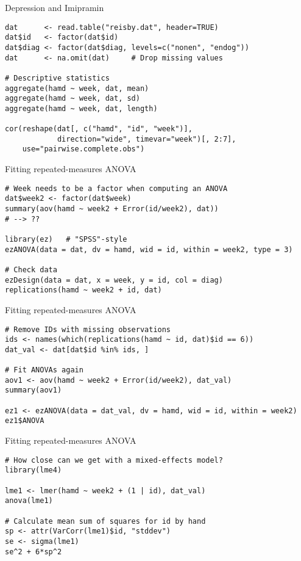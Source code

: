 \documentclass[aspectratio=169]{beamer}
\begin{document}
{

\begin{frame}[fragile]{Depression and Imipramin}
  \begin{lstlisting}
dat      <- read.table("reisby.dat", header=TRUE)
dat$id   <- factor(dat$id)
dat$diag <- factor(dat$diag, levels=c("nonen", "endog"))
dat      <- na.omit(dat)     # Drop missing values

# Descriptive statistics
aggregate(hamd ~ week, dat, mean)
aggregate(hamd ~ week, dat, sd)
aggregate(hamd ~ week, dat, length)

cor(reshape(dat[, c("hamd", "id", "week")], 
            direction="wide", timevar="week")[, 2:7],
    use="pairwise.complete.obs")
  \end{lstlisting}
\end{frame}

\begin{frame}[fragile]{Fitting repeated-measures ANOVA}
  \begin{lstlisting}
# Week needs to be a factor when computing an ANOVA
dat$week2 <- factor(dat$week)
summary(aov(hamd ~ week2 + Error(id/week2), dat))
# --> ?? 

library(ez)   # "SPSS"-style
ezANOVA(data = dat, dv = hamd, wid = id, within = week2, type = 3)

# Check data
ezDesign(data = dat, x = week, y = id, col = diag)
replications(hamd ~ week2 + id, dat)
  \end{lstlisting}
\end{frame}

\begin{frame}[fragile]{Fitting repeated-measures ANOVA}
  \begin{lstlisting}
# Remove IDs with missing observations
ids <- names(which(replications(hamd ~ id, dat)$id == 6))
dat_val <- dat[dat$id %in% ids, ]

# Fit ANOVAs again
aov1 <- aov(hamd ~ week2 + Error(id/week2), dat_val)
summary(aov1)

ez1 <- ezANOVA(data = dat_val, dv = hamd, wid = id, within = week2)
ez1$ANOVA
  \end{lstlisting}
\end{frame}

\begin{frame}[fragile]{Fitting repeated-measures ANOVA}
  \begin{lstlisting}
# How close can we get with a mixed-effects model?
library(lme4)

lme1 <- lmer(hamd ~ week2 + (1 | id), dat_val)
anova(lme1)

# Calculate mean sum of squares for id by hand
sp <- attr(VarCorr(lme1)$id, "stddev")
se <- sigma(lme1)
se^2 + 6*sp^2
  \end{lstlisting}
\end{frame}

}
\end{document}
